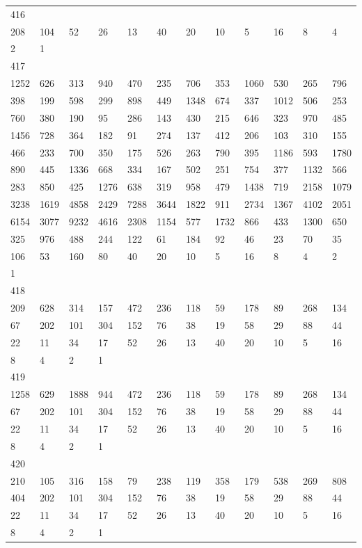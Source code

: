\begin{longtable}{llllllllllll}
416&&&&&&&&&&&\\
208& 104& 52& 26& 13& 40& 20& 10& 5& 16& 8& 4\\
2& 1& \\

417&&&&&&&&&&&\\
1252& 626& 313& 940& 470& 235& 706& 353& 1060& 530& 265& 796\\
398& 199& 598& 299& 898& 449& 1348& 674& 337& 1012& 506& 253\\
760& 380& 190& 95& 286& 143& 430& 215& 646& 323& 970& 485\\
1456& 728& 364& 182& 91& 274& 137& 412& 206& 103& 310& 155\\
466& 233& 700& 350& 175& 526& 263& 790& 395& 1186& 593& 1780\\
890& 445& 1336& 668& 334& 167& 502& 251& 754& 377& 1132& 566\\
283& 850& 425& 1276& 638& 319& 958& 479& 1438& 719& 2158& 1079\\
3238& 1619& 4858& 2429& 7288& 3644& 1822& 911& 2734& 1367& 4102& 2051\\
6154& 3077& 9232& 4616& 2308& 1154& 577& 1732& 866& 433& 1300& 650\\
325& 976& 488& 244& 122& 61& 184& 92& 46& 23& 70& 35\\
106& 53& 160& 80& 40& 20& 10& 5& 16& 8& 4& 2\\
1& \\

418&&&&&&&&&&&\\
209& 628& 314& 157& 472& 236& 118& 59& 178& 89& 268& 134\\
67& 202& 101& 304& 152& 76& 38& 19& 58& 29& 88& 44\\
22& 11& 34& 17& 52& 26& 13& 40& 20& 10& 5& 16\\
8& 4& 2& 1& \\

419&&&&&&&&&&&\\
1258& 629& 1888& 944& 472& 236& 118& 59& 178& 89& 268& 134\\
67& 202& 101& 304& 152& 76& 38& 19& 58& 29& 88& 44\\
22& 11& 34& 17& 52& 26& 13& 40& 20& 10& 5& 16\\
8& 4& 2& 1& \\

420&&&&&&&&&&&\\
210& 105& 316& 158& 79& 238& 119& 358& 179& 538& 269& 808\\
404& 202& 101& 304& 152& 76& 38& 19& 58& 29& 88& 44\\
22& 11& 34& 17& 52& 26& 13& 40& 20& 10& 5& 16\\
8& 4& 2& 1& \\


\end{longtable}
